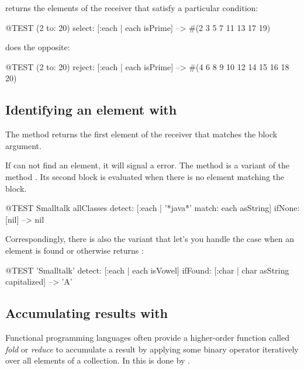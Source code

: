\documentclass[a4paper,10pt,twoside]{book}
\begin{document}
 returns the elements of the receiver that satisfy a particular condition:

\begin{code}{@TEST}
(2 to: 20) select: [:each | each isPrime] --> #(2 3 5 7 11 13 17 19)
\end{code}

 does the opposite:
\begin{code}{@TEST}
(2 to: 20) reject: [:each | each isPrime] --> #(4 6 8 9 10 12 14 15 16 18 20)
\end{code}

\subsection{Identifying an element with }
The method  returns the first element of the receiver that matches the block argument.


If  can not find an element, it will signal a  error.
The method  is a variant of the method .
Its second block is evaluated when there is no element matching the block.

\begin{code}{@TEST}
Smalltalk allClasses detect: [:each | '*java*' match: each asString] ifNone: [nil] --> nil
\end{code}

Correspondingly, there is also the variant  that let's you handle the case when an element is found or otherwise returns :

\begin{code}{@TEST}
'Smalltalk' detect: [:each | each isVowel] ifFound: [:char | char asString capitalized] --> 'A'
\end{code}

\subsection{Accumulating results with }
Functional programming languages often provide a higher-order function called \emph{fold} or \emph{reduce} to accumulate a result by applying some binary operator iteratively over all elements of a collection.
In \sq this is done by .
\end{document}
